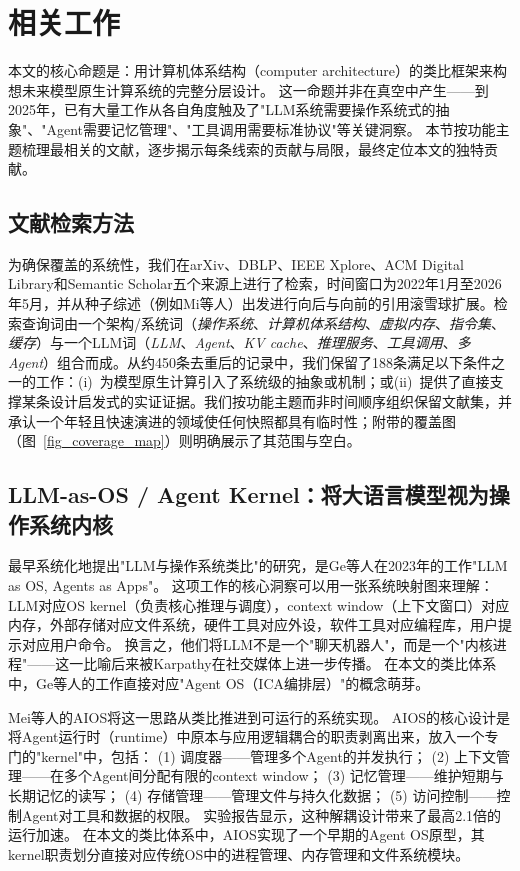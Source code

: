 \section{相关工作}
\label{sec:related}

本文的核心命题是：用计算机体系结构（computer architecture）的类比框架来构想未来模型原生计算系统的完整分层设计。
这一命题并非在真空中产生——到2025年，已有大量工作从各自角度触及了"LLM系统需要操作系统式的抽象"、"Agent需要记忆管理"、"工具调用需要标准协议"等关键洞察。
本节按功能主题梳理最相关的文献，逐步揭示每条线索的贡献与局限，最终定位本文的独特贡献。

\subsection{文献检索方法}
\label{sec:related-method}
为确保覆盖的系统性，我们在arXiv、DBLP、IEEE Xplore、ACM Digital Library和Semantic Scholar五个来源上进行了检索，时间窗口为2022年1月至2026年5月，并从种子综述（例如Mi等人\cite{mi2025llmagentscomputersystems}）出发进行向后与向前的引用滚雪球扩展。检索查询词由一个架构/系统词（\emph{操作系统}、\emph{计算机体系结构}、\emph{虚拟内存}、\emph{指令集}、\emph{缓存}）与一个LLM词（\emph{LLM}、\emph{Agent}、\emph{KV cache}、\emph{推理服务}、\emph{工具调用}、\emph{多Agent}）组合而成。从约450条去重后的记录中，我们保留了188条满足以下条件之一的工作：(i)~为模型原生计算引入了系统级的抽象或机制；或(ii)~提供了直接支撑某条设计启发式的实证证据。我们按功能主题而非时间顺序组织保留文献集，并承认一个年轻且快速演进的领域使任何快照都具有临时性；附带的覆盖图（图~\ref{fig_coverage_map}）则明确展示了其范围与空白。

\subsection{LLM-as-OS / Agent Kernel：将大语言模型视为操作系统内核}
\label{sec:related-llmos}

最早系统化地提出"LLM与操作系统类比"的研究，是Ge等人在2023年的工作"LLM as OS, Agents as Apps"\cite{ge2023llmos}。
这项工作的核心洞察可以用一张系统映射图来理解：LLM对应OS kernel（负责核心推理与调度），context window（上下文窗口）对应内存，外部存储对应文件系统，硬件工具对应外设，软件工具对应编程库，用户提示对应用户命令。
换言之，他们将LLM不是一个"聊天机器人"，而是一个"内核进程"——这一比喻后来被Karpathy在社交媒体上进一步传播。
在本文的类比体系中，Ge等人的工作直接对应"Agent OS（ICA编排层）"的概念萌芽。

Mei等人的AIOS\cite{mei2024aios}将这一思路从类比推进到可运行的系统实现。
AIOS的核心设计是将Agent运行时（runtime）中原本与应用逻辑耦合的职责剥离出来，放入一个专门的"kernel"中，包括：
(1) 调度器——管理多个Agent的并发执行；
(2) 上下文管理——在多个Agent间分配有限的context window；
(3) 记忆管理——维护短期与长期记忆的读写；
(4) 存储管理——管理文件与持久化数据；
(5) 访问控制——控制Agent对工具和数据的权限。
实验报告显示，这种解耦设计带来了最高2.1倍的运行加速。
在本文的类比体系中，AIOS实现了一个早期的Agent OS原型，其kernel职责划分直接对应传统OS中的进程管理、内存管理和文件系统模块。


